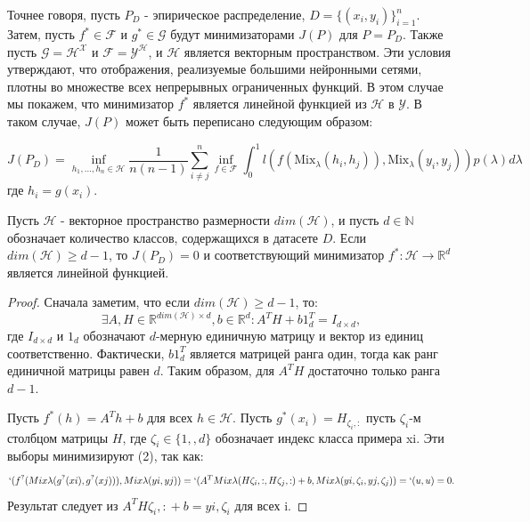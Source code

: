 Точнее говоря, пусть $P_D$ - эпирическое распределение, $D = \{(x_i, y_i)\}_{i=1}^{n}$. Затем, пусть $f^* \in \mathcal{F}$ и $g^* \in \mathcal{G}$ будут минимизаторами $J(P)$ для $P = P_D$. Также пусть $\mathcal{G} = \mathcal{H}^\mathcal{X}$ и $\mathcal{F} = \mathcal{Y}^\mathcal{H}$, и $\mathcal{H}$ является векторным пространством. Эти условия утверждают, что отображения, реализуемые большими нейронными сетями, плотны во множестве всех непрерывных ограниченных функций. В этом случае мы покажем, что минимизатор $f^*$ является линейной функцией из $\mathcal{H}$ в $\mathcal{Y}$. В таком случае, $J(P)$ может быть переписано следующим образом:

\begin{equation}
J(P_D) = \inf_{h_1,...,h_n \in \mathcal{H}} \frac{1}{n(n-1)} \sum_{i \neq j}^n \inf_{f \in \mathcal{F}} \int_{0
}^{1} l( f(\text{Mix}_{\lambda}(h_i, h_j)), \text{Mix}_{\lambda}(y_i, y_j)) p(\lambda) d\lambda
\end{equation}
где $h_i = g(x_i)$.

\begin{theorem}
Пусть $\mathcal{H}$ - векторное пространство размерности $dim(\mathcal{H})$, и пусть $d \in \mathbb{N}$ обозначает количество классов, содержащихся в датасете $D$. Если $dim (\mathcal{H}) \geq d-1$, то $J(P_D) = 0$ и соответствующий минимизатор $f^*: \mathcal{H} \rightarrow \mathbb{R}^d$ является линейной функцией.
\end{theorem}
\begin{proof}
Сначала заметим, что если $dim(\mathcal{H}) \geq d - 1$, то:
$$ \exists A, H \in \mathbb{R}^{dim(\mathcal{H}) \times d}, b \in \mathbb{R}^{d}: A^T H + b1_{d}^T = I_{d \times d}, $$
где $I_{d \times d}$ и $1_d$ обозначают $d$-мерную единичную матрицу и вектор из единиц соответственно. Фактически,
$b1_{d}^T$ является матрицей ранга один, тогда как ранг единичной матрицы равен $d$. Таким образом, для $A^T H$ достаточно только ранга $d - 1$.

Пусть $f^{*}(h) = A^T h + b$ для всех $h \in \mathcal{H}$. Пусть $g^{*}(x_i) = H_{\zeta_i,:}$ пусть $\zeta_i$-м столбцом матрицы $H$, где
$\zeta_i \in \{1, , d\}$ обозначает индекс класса примера xi. Эти выборы минимизируют (2), так как:
$$ `(f^?(Mix\lambda(g^?(xi), g^?(xj))), Mix\lambda(yi, yj)) = `(A^T Mix\lambda(H{\zeta_i,:}, H{\zeta_j,:}) + b, Mix\lambda(y{i,\zeta_i}, y{j,\zeta_j})) = `(u, u) = 0. $$
Результат следует из $A^T H{\zeta_i,:} + b = y{i,\zeta_i}$ для всех i.
\end{proof}


\newpage